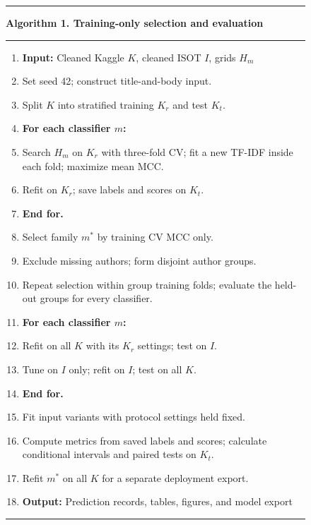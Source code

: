 \documentclass[conference]{IEEEtran}
\newcounter{algorithm}
\begin{document}
\begin{figure}[t]
\centering\begin{minipage}{\columnwidth}
\hrule\vspace{3pt}\textbf{Algorithm 1. Training-only selection and evaluation}\label{alg:eval}\vspace{3pt}\hrule
\begin{enumerate}[leftmargin=1.6em,itemsep=1pt,topsep=3pt,label=\arabic*.]\footnotesize
\item[]\textbf{Input:} Cleaned Kaggle $K$, cleaned ISOT $I$, grids $H_m$
\item Set seed 42; construct title-and-body input.
\item Split $K$ into stratified training $K_r$ and test $K_t$.
\item\textbf{For each classifier $m$:}
\item Search $H_m$ on $K_r$ with three-fold CV; fit a new TF-IDF inside each fold; maximize mean MCC.
\item Refit on $K_r$; save labels and scores on $K_t$.
\item\textbf{End for.}
\item Select family $m^*$ by training CV MCC only.
\item Exclude missing authors; form disjoint author groups.
\item Repeat selection within group training folds; evaluate the held-out groups for every classifier.
\item\textbf{For each classifier $m$:}
\item Refit on all $K$ with its $K_r$ settings; test on $I$.
\item Tune on $I$ only; refit on $I$; test on all $K$.
\item\textbf{End for.}
\item Fit input variants with protocol settings held fixed.
\item Compute metrics from saved labels and scores; calculate conditional intervals and paired tests on $K_t$.
\item Refit $m^*$ on all $K$ for a separate deployment export.
\item[]\textbf{Output:} Prediction records, tables, figures, and model export
\end{enumerate}\hrule
\end{minipage}
\end{figure}
\end{document}
